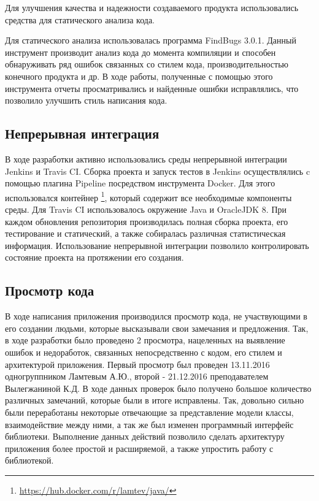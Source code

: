 Для улучшения качества и надежности создаваемого продукта использовались средства для статического анализа кода.

Для статического анализа использовалась программа FindBugs 3.0.1. Данный инструмент производит анализ кода до момента компиляции и способен обнаруживать ряд ошибок связанных со стилем кода, производительностью конечного продукта и др. В ходе работы, полученные с помощью этого инструмента отчеты просматривались и найденные ошибки исправлялись, что позволило улучшить стиль написания кода.

\subsection{Непрерывная интеграция}

В ходе разработки активно использовались среды непрерывной интеграции Jenkins и Travis CI. Сборка проекта и запуск тестов в Jenkins осуществлялись c помощью плагина Pipeline посредством инструмента Docker. Для этого использовался контейнер \footnote{\url{https://hub.docker.com/r/lamtev/java/}}, который содержит все необходимые компоненты среды. Для Travis CI использовалось окружение Java и OracleJDK 8. При каждом обновления репозитория производилась полная сборка проекта, его тестирование и статический, а также собиралась различная статистическая информация. Использование непрерывной интеграции позволило контролировать состояние проекта на протяжении его создания.  
\subsection{Просмотр кода}

В ходе написания приложения производился просмотр кода, не участвующими в его создании людьми, которые высказывали свои замечания и предложения. Так, в ходе разработки было проведено 2 просмотра, нацеленных на выявление ошибок и недоработок, связанных  непосредственно с кодом, его стилем и архитектурой приложения. Первый просмотр был проведен 13.11.2016 одногруппником Ламтевым А.Ю., второй - 21.12.2016 преподавателем Вылегжаниной К.Д. В ходе данных проверок было получено большое количество различных замечаний, которые были в итоге исправлены. Так, довольно сильно были переработаны некоторые отвечающие за представление модели классы, взаимодействие между ними, а так же был изменен программный интерфейс библиотеки. Выполнение данных действий позволило сделать архитектуру приложения более простой и расширяемой, а также упростить работу с библиотекой.

